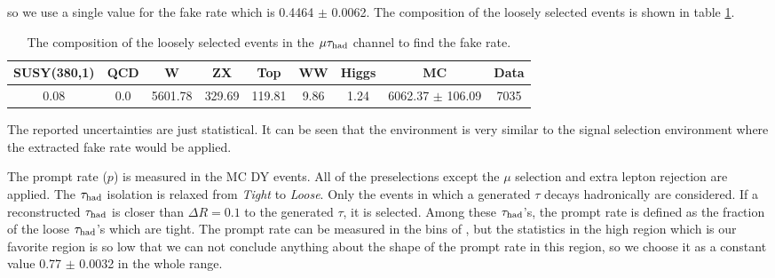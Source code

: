 so we use a single value for the fake rate which is 0.4464 $\pm$ 0.0062. The composition of the loosely selected events is shown in table \ref{tbl:Composition}. 
\begin{table}[!Hhtb]
\begin{center}
\begin{tabular}{ccccccccc}
\hline
\hline
  SUSY(380,1) & QCD &    W    & ZX     &    Top    &  WW  & Higgs &                MC & Data \\
\hline
 0.08         & 0.0 & 5601.78 & 329.69 &   119.81  & 9.86 & 1.24  & 6062.37 $\pm$ 106.09 & 7035\\
\hline
\hline
\end{tabular}
\caption{The composition of the loosely selected events in the $\mu\tau_{\rm had}$ channel to find the fake rate.}
\label{tbl:Composition}
\end{center}
\end{table}
The reported uncertainties are just statistical. It can be seen that the environment is very similar to the signal selection environment where the 
extracted fake rate would be applied.

The prompt rate ($p$) is measured in the MC DY events. All of the preselections except the $\mu$ selection and extra lepton rejection %
are applied. 
The $\tau_{\rm had}$ isolation 
is relaxed from {\it Tight} to {\it Loose}. Only the events in which a generated $\tau$ decays hadronically are considered. If a reconstructed $\tau_{\rm had}$ is 
closer than $\Delta R = 0.1$ to the generated $\tau$, it is selected. Among these $\tau_{\rm had}$'s, the prompt rate is defined as the fraction of the loose $\tau_{\rm had}$'s 
which are tight. The prompt rate can be measured in the bins of \mttwo, but the statistics in the high \mttwo region which is our favorite 
region is so low that we can not conclude anything about the shape of the prompt rate in this region, so we choose it as a constant value
0.77 $\pm$ 0.0032 in the whole \mttwo range.

